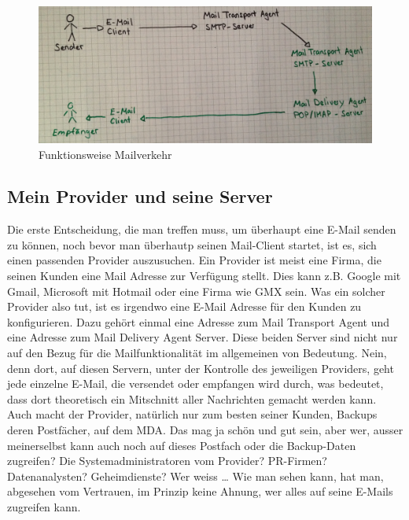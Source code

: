 \begin{figure}
\centering
\noindent\includegraphics[scale=0.14]{images/mailverkehr.jpg}
\caption{Funktionsweise Mailverkehr}
\end{figure}


\subsection{Mein Provider und seine Server}
Die erste Entscheidung, die man treffen muss, um überhaupt eine E-Mail senden zu können, noch bevor man überhautp seinen Mail-Client startet, ist es, sich einen passenden Provider auszusuchen. Ein Provider ist meist eine Firma, die seinen Kunden eine Mail Adresse zur Verfügung stellt. Dies kann z.B. Google mit Gmail, Microsoft mit Hotmail oder eine Firma wie GMX sein. Was ein solcher Provider also tut, ist es irgendwo eine E-Mail Adresse für den Kunden zu konfigurieren. Dazu gehört einmal eine Adresse zum Mail Transport Agent und eine Adresse zum Mail Delivery Agent Server.
Diese beiden Server sind nicht nur auf den Bezug für die Mailfunktionalität im allgemeinen von Bedeutung. Nein, denn dort, auf diesen Servern, unter der Kontrolle des jeweiligen Providers, geht jede einzelne E-Mail, die versendet oder empfangen wird durch, was bedeutet, dass dort theoretisch ein Mitschnitt aller Nachrichten gemacht werden kann. Auch macht der Provider, natürlich nur zum besten seiner Kunden, Backups deren Postfächer, auf dem MDA. Das mag ja schön und gut sein, aber wer, ausser meinerselbst kann auch noch auf dieses Postfach oder die Backup-Daten zugreifen? Die Systemadministratoren vom Provider? PR-Firmen? Datenanalysten? Geheimdienste? Wer weiss …
Wie man sehen kann, hat man, abgesehen vom Vertrauen, im Prinzip keine Ahnung, wer alles auf seine E-Mails zugreifen kann.
